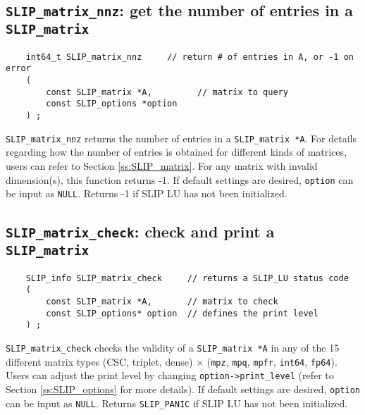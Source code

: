\documentclass[12pt]{article}
\theoremstyle{definition}
\begin{document}
\cprotect\subsection{\verb|SLIP_matrix_nnz|: get the number of entries in a
\verb|SLIP_matrix|}
\label{s:user:matrix_nnz}

\begin{mdframed}[userdefinedwidth=6in]
{\footnotesize
\begin{verbatim}
    int64_t SLIP_matrix_nnz     // return # of entries in A, or -1 on error
    (
        const SLIP_matrix *A,         // matrix to query
        const SLIP_options *option
    ) ;
\end{verbatim}
} \end{mdframed}

\verb|SLIP_matrix_nnz| returns the number of entries in a \verb|SLIP_matrix *A|.
For details regarding how the number of entries is obtained for different kinds
of matrices, users can refer to Section \ref{ss:SLIP_matrix}.
For any matrix with invalid dimension(s), this function returns -1.
If default settings are desired, \verb|option| can be input as \verb|NULL|.
Returns -1 if SLIP LU has not been initialized.

\newpage
\cprotect\subsection{\verb|SLIP_matrix_check|: check and print a \verb|SLIP_matrix|}
\label{s:user:matrix_check}

\begin{mdframed}[userdefinedwidth=6in]
{\footnotesize
\begin{verbatim}
    SLIP_info SLIP_matrix_check     // returns a SLIP_LU status code
    (
        const SLIP_matrix *A,       // matrix to check
        const SLIP_options* option  // defines the print level
    ) ;
\end{verbatim}
} \end{mdframed}

\verb|SLIP_matrix_check| checks the validity of a \verb|SLIP_matrix *A| in any
of the 15 different matrix types (CSC, triplet, dense) $\times$ (\verb|mpz|, \verb|mpq|,
\verb|mpfr|, \verb|int64|, \verb|fp64|). Users can adjust the print level by changing
\verb|option->print_level| (refer to Section \ref{ss:SLIP_options} for more
details).
If default settings are desired, \verb|option| can be input as \verb|NULL|.
Returns \verb|SLIP_PANIC| if SLIP LU has not been initialized.
\end{document}
